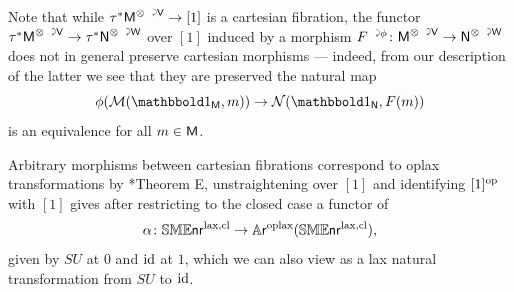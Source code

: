\documentclass[a4paper,11pt]{article}
\begin{document}
\begin{observation}\label{obs:taucartmor}
  Note that while $\tau^{*}\utract{M}{V} \to [1]$ is a cartesian
  fibration, the functor
  $\tau^{*}\utract{M}{V} \to \tau^{*}\utract{N}{W}$ over $[1]$ induced
  by a morphism
  $\ract{F}{\phi} \colon \utract{M}{V} \to \utract{N}{W}$ does not in
  general preserve cartesian morphisms --- indeed, from our
  description of the latter we see that they are preserved \IFF{} the
  natural map
\[ \phi (\nM(\bbone_{\uM}, m)) \to \nN(\bbone_{\uN}, F(m)) \] is an
equivalence for all $m \in \textup{\textsf{M}}$.
\end{observation}

\begin{construction}
  Arbitrary morphisms between cartesian fibrations correspond to oplax
  transformations by \cite{HHLN1}*{Theorem E}, unstraightening over
  $[1]$ and identifying $[1]^{\text{\textup{op}}}$ with $[1]$ gives after restricting
  to the closed case a functor of \itcats{}
  \begin{equation}
    \label{eq:SUlax}
    \alpha \colon \SMENRlcl \to \ARopl(\SMENRlcl),  
  \end{equation}
  given by $SU$ at $0$ and $\text{\textup{id}}$ at $1$,
  which we can also view as a lax natural transformation from $SU$ to
  $\text{\textup{id}}$.
\end{construction}
\end{document}
